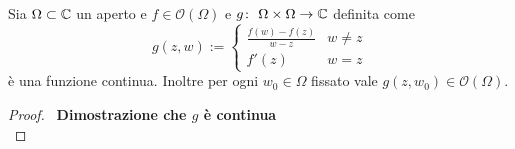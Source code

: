  \begin{lemma}
   Sia $\Omega \subset \mathbb{C}$ un aperto e $f \in \mathcal{O}(\Omega)$
   e $g \colon\ \Omega\times\Omega \rightarrow \mathbb{C}$ definita come 
   \begin{equation*}
     g(z,w) :=
     \begin{cases}
       \frac{f(w) - f(z)}{w-z} & w \neq z \\
       f'(z)                   & w = z
     \end{cases}
   \end{equation*}
   è una funzione continua. Inoltre per ogni $w_0 \in \Omega$ fissato vale
   $g(z,w_0) \in \mathcal{O}(\Omega)$.
   \label{lem:rapporto-incrementale-funzione-olomorfa}
 \end{lemma}
 \begin{proof}\
    \textbf{Dimostrazione che $g$ è continua} \\
    

\end{proof}
